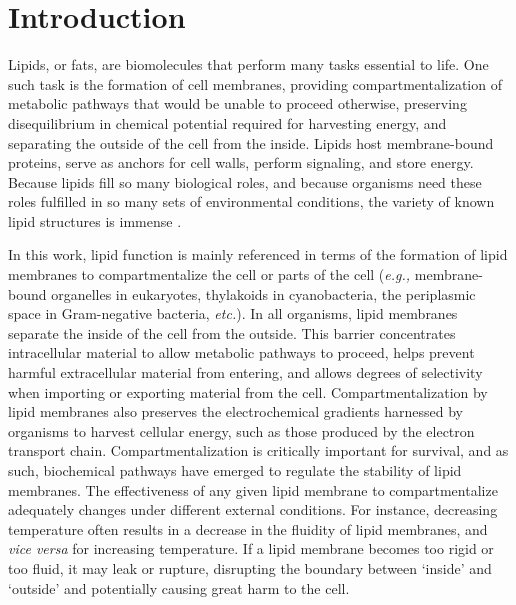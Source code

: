 \chapter[INTRODUCTION]{Introduction}


Lipids, or fats, are biomolecules that perform many tasks essential to life. One such task is the formation of cell membranes, providing compartmentalization of metabolic pathways that would be unable to proceed otherwise, preserving disequilibrium in chemical potential required for harvesting energy, and separating the outside of the cell from the inside. Lipids host membrane-bound proteins, serve as anchors for cell walls, perform signaling, and store energy. Because lipids fill so many biological roles, and because organisms need these roles fulfilled in so many sets of environmental conditions, the variety of known lipid structures is immense \citep[\textit{e.g.,}][]{Sturt_Intact_2004, belin2018hopanoid, van2008membrane, Yoshinaga_Systematic_2011, schouten2013organic}.

In this work, lipid function is mainly referenced in terms of the formation of lipid membranes to compartmentalize the cell or parts of the cell (\textit{e.g.,} membrane-bound organelles in eukaryotes, thylakoids in cyanobacteria, the periplasmic space in Gram-negative bacteria, \textit{etc.}). In all organisms, lipid membranes separate the inside of the cell from the outside. This barrier concentrates intracellular material to allow metabolic pathways to proceed, helps prevent harmful extracellular material from entering, and allows degrees of selectivity when importing or exporting material from the cell. Compartmentalization by lipid membranes also preserves the electrochemical gradients harnessed by organisms to harvest cellular energy, such as those produced by the electron transport chain. Compartmentalization is critically important for survival, and as such, biochemical pathways have emerged to regulate the stability of lipid membranes. The effectiveness of any given lipid membrane to compartmentalize adequately changes under different external conditions. For instance, decreasing temperature often results in a decrease in the fluidity of lipid membranes, and \textit{vice versa} for increasing temperature. If a lipid membrane becomes too rigid or too fluid, it may leak or rupture, disrupting the boundary between `inside' and `outside' and potentially causing great harm to the cell. %

